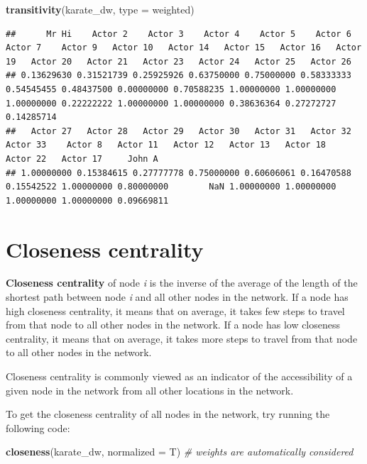 \documentclass[
]{book}
\newenvironment{Shaded}{\begin{snugshade}}{\end{snugshade}}
\newcommand{\AttributeTok}[1]{\textcolor[rgb]{0.13,0.29,0.53}{#1}}
\newcommand{\CommentTok}[1]{\textcolor[rgb]{0.56,0.35,0.01}{\textit{#1}}}
\newcommand{\FunctionTok}[1]{\textcolor[rgb]{0.13,0.29,0.53}{\textbf{#1}}}
\newcommand{\NormalTok}[1]{#1}
\newcommand{\StringTok}[1]{\textcolor[rgb]{0.31,0.60,0.02}{#1}}
\begin{document}
\begin{Shaded}
\begin{Highlighting}[]
\FunctionTok{transitivity}\NormalTok{(karate\_dw, }\AttributeTok{type =} \StringTok{\textquotesingle{}weighted\textquotesingle{}}\NormalTok{)}
\end{Highlighting}
\end{Shaded}

\begin{verbatim}
##      Mr Hi    Actor 2    Actor 3    Actor 4    Actor 5    Actor 6    Actor 7    Actor 9   Actor 10   Actor 14   Actor 15   Actor 16   Actor 19   Actor 20   Actor 21   Actor 23   Actor 24   Actor 25   Actor 26 
## 0.13629630 0.31521739 0.25925926 0.63750000 0.75000000 0.58333333 0.54545455 0.48437500 0.00000000 0.70588235 1.00000000 1.00000000 1.00000000 0.22222222 1.00000000 1.00000000 0.38636364 0.27272727 0.14285714 
##   Actor 27   Actor 28   Actor 29   Actor 30   Actor 31   Actor 32   Actor 33    Actor 8   Actor 11   Actor 12   Actor 13   Actor 18   Actor 22   Actor 17     John A 
## 1.00000000 0.15384615 0.27777778 0.75000000 0.60606061 0.16470588 0.15542522 1.00000000 0.80000000        NaN 1.00000000 1.00000000 1.00000000 1.00000000 0.09669811
\end{verbatim}

\section{Closeness centrality}\label{closeness-centrality}

\textbf{Closeness centrality} of node \emph{i} is the inverse of the average of the length of the shortest path between node \emph{i} and all other nodes in the network. If a node has high closeness centrality, it means that on average, it takes few steps to travel from that node to all other nodes in the network. If a node has low closeness centrality, it means that on average, it takes more steps to travel from that node to all other nodes in the network.

Closeness centrality is commonly viewed as an indicator of the accessibility of a given node in the network from all other locations in the network.

To get the closeness centrality of all nodes in the network, try running the following code:

\begin{Shaded}
\begin{Highlighting}[]
\FunctionTok{closeness}\NormalTok{(karate\_dw, }\AttributeTok{normalized =}\NormalTok{ T) }\CommentTok{\# weights are automatically considered}
\end{Highlighting}
\end{Shaded}
\end{document}
